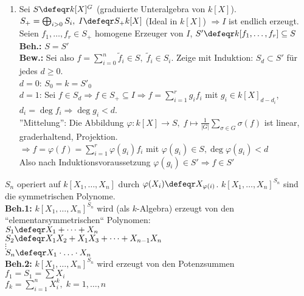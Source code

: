 \begin{Bew}
  \begin{enumerate}
    \item 
      Sei $S \defeqr k[X]^G$ (graduierte Unteralgebra von $k[X]$).\\
      $S_+ = \bigoplus_{i > 0} S_i, \; I \defeqr S_+ k[X]$ (Ideal in $k[X]$) 
      $\Rightarrow I$ ist endlich erzeugt.\\
      Seien $f_1, \dots, f_r \in S_+$ homogene Erzeuger von $I$, $S' \defeqr k[f_1,
      \dots, f_r] \subseteq S$\\
      \textbf{Beh.:} $S=S'$\\
      \textbf{Bew.:} Sei also $f = \sum_{i=0}^n \tilde{f}_i \in S, \; \tilde{f}_i
      \in S_i$. Zeige mit Induktion: $S_d \subset S'$ für jedes $d \ge 0$.\\
      $d = 0$: $S_0 = k = S'_0$\\
      $d = 1$: Sei $f \in S_d \Rightarrow f \in S_+ \subseteq I \Rightarrow f =
      \sum_{i=1}^r g_i f_i$ mit $g_i \in k[X]_{d- d_i}$, $d_i = \deg{f_i}
      \Rightarrow \deg{g_i} < d$.\\
      ''Mittelung'': Die Abbildung $\varphi: k[X] \to S, \; f \mapsto
      \frac{1}{|G|} \sum_{\sigma \in G} \sigma(f)$ ist linear, graderhaltend,
      Projektion.\\
      $\Rightarrow f = \varphi(f) = \sum_{i=1}^r \varphi(g_i) f_i$ mit
      $\varphi(g_i) \in S,\deg{\varphi(g_i)}<d$\\
      Also nach Induktionsvoraussetzung $\varphi(g_i) \in S' \Rightarrow f \in
      S'$
  \end{enumerate}
\end{Bew}

\begin{nnBsp}
  $S_n$ operiert auf $k[X_1, \dots, X_n]$ durch $\varphi(X_i) \defeqr
  X_{\varphi(i)}$. $k[X_1, \dots, X_n]^{S_n}$ sind die symmetrischen Polynome.\\
  \textbf{Beh.1:} $k[X_1, \dots, X_n]^{S_n}$ wird (als $k$-Algebra) erzeugt von
  den ``elementarsymmetrischen`` Polynomen:\\ $S_1 \defeqr X_1 + \dots + X_n$\\
  $S_2 \defeqr X_1X_2 + X_1X_3 + \dots + X_{n-1}X_n$\\
  $\vdots$\\
  $S_n \defeqr X_1 \cdot \ldots \cdot X_n$\\
  \textbf{Beh.2:} $k[X_1, \dots, X_n]^{S_n}$ wird erzeugt von den Potenzsummen\\
  $f_1 = S_1 = \sum X_i$\\
  $f_k = \sum_{i=1}^n X_i^k, \; k = 1, \dots, n$
\end{nnBsp}

